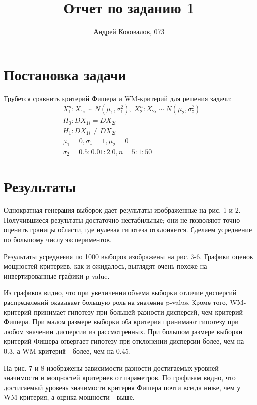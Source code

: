 \documentclass[10pt]{article}
\title{Отчет по заданию 1}
\author{Андрей Коновалов, 073}
\date{}
\begin{document}
\maketitle

\section{Постановка задачи}

Трубется сравнить критерий Фишера и WM-критерий для решения задачи:
\begin{align*}
    & X_1^n: X_{1i} \sim N(\mu_1, \sigma_1^2), \; X_2^n: X_{2i} \sim N(\mu_2, \sigma_2^2) \\
    & H_0: D X_{1i} = D X_{2i} \\
    & H_1: D X_{1i} \neq D X_{2i} \\
    & \mu_1 = 0, \sigma_1 = 1, \mu_2 = 0 \\
    & \sigma_2 = 0.5 : 0.01 : 2.0, n = 5 : 1 : 50
\end{align*}

\section{Результаты}

Однократная генерация выборок дает результаты изображенные на рис. 1 и 2.
Получившиеся результаты достаточно нестабильные; они не позволяют точно оценить границы области, где нулевая гипотеза отклоняется.
Сделаем усреднение по большому числу экспериментов.

Результаты усреднения по 1000 выборок изображены на рис. 3-6.
Графики оценок мощностей критериев, как и ожидалось, выглядят очень похоже на инвертированные графики p-value.

Из графиков видно, что при увеличении объема выборки отличие дисперсий распределений оказывает большую роль на значение p-value.
Кроме того, WM-критерий принимает гипотезу при большей разности дисперсий, чем критерий Фишера.
При малом размере выборки оба критерия принимают гипотезу при любом значении дисперсии из рассмотренных.
При большом размере выборки критерий Фишера отвергает гипотезу при отклонении дисперсии более, чем на 0.3, а WM-критерий - более, чем на 0.45.

На рис. 7 и 8 изображены зависимости разности достигаемых уровней значимости и мощностей критериев от параметров.
По графикам видно, что достигаемый уровень значимости критерия Фишера почти всегда ниже, чем у WM-критерия, а оценка мощности - выше.
\end{document}
